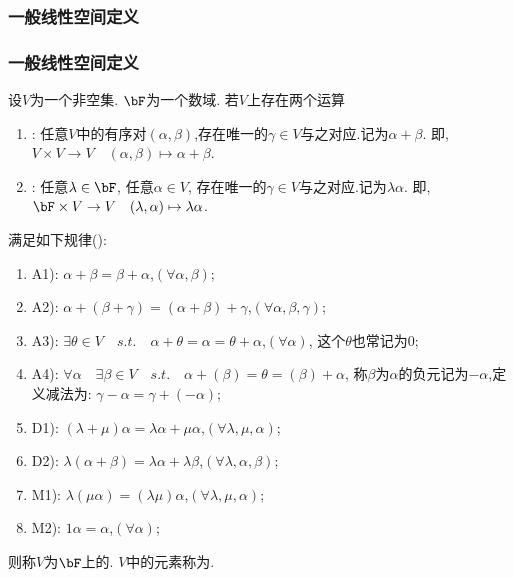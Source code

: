 \subsubsection{一般线性空间定义}
\begin{frame}\frametitle{一般线性空间定义}
设$V$为一个非空集. $\bF$为一个数域. 若$V$上存在两个运算\pp
\begin{enumerate}
\item {}: 任意$V$中的有序对$(\alpha,\beta)$,存在唯一的$\gamma\in V$与之对应.记为$\alpha+\beta$. 即, $V\times V \rightarrow V \quad (\alpha,\beta)\mapsto \alpha+\beta$. \pp
\item {}: 任意$\lambda\in \bF$, 任意$\alpha\in V$, 存在唯一的$\gamma\in V$与之对应.记为$\lambda\alpha$. 即, $\bF\times V\rightarrow V \quad (\lambda,\alpha)\mapsto \lambda \alpha$.
\pp
\end{enumerate}
满足如下规律(): \pp
\begin{enumerate}
\item A1): $\alpha+\beta=\beta+\alpha$,\quad $(\forall\alpha,\beta)$; \pp
\item A2): $\alpha+(\beta+\gamma)=(\alpha+\beta)+\gamma$,\quad $(\forall\alpha,\beta,\gamma)$; \pp
\item A3): $\exists\theta\in V\quad s.t. \quad \alpha+\theta=\alpha=\theta+\alpha$,\quad $(\forall\alpha)$, 这个$\theta$也常记为$0$; \pp
\item A4): $\forall \alpha \quad \exists \beta\in V \quad s.t. \quad \alpha+(\beta)=\theta=(\beta)+\alpha$, 称$\beta$为$\alpha$的负元记为$-\alpha$,定义减法为: $\gamma-\alpha=\gamma+(-\alpha)$; \pp
\item D1): $(\lambda+\mu)\alpha=\lambda \alpha + \mu \alpha$,\quad $(\forall \lambda,\mu,\alpha)$; \pp
\item D2): $\lambda (\alpha+\beta) =\lambda \alpha + \lambda \beta$,\quad $(\forall\lambda,\alpha,\beta)$; \pp
\item M1): $\lambda(\mu \alpha)=(\lambda \mu)\alpha$,\quad $(\forall\lambda,\mu,\alpha)$; \pp
\item M2): $1\alpha = \alpha$,\quad $(\forall\alpha)$;
\end{enumerate}\pp
则称$V$为$\bF$上的. \pp $V$中的元素称为.  \pp
\end{frame}





